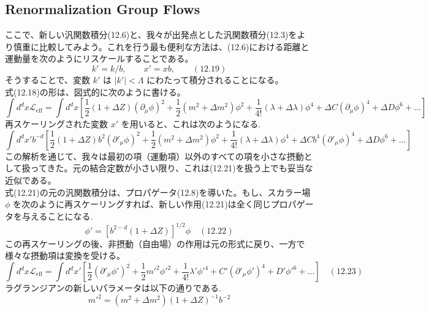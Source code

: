 \documentclass[uplatex,dvipdfmx]{jsarticle}
\begin{document}
\subsection{Renormalization Group Flows}
ここで、新しい汎関数積分(12.6)と、我々が出発点とした汎関数積分(12.3)をより慎重に比較してみよう。これを行う最も便利な方法は、(12.6)における距離と運動量を次のようにリスケールすることである。
\begin{equation}
    k' = k/b, \qquad x' = xb, \qquad (12.19)
\end{equation}
そうすることで、変数 $k'$ は $|k'| < \Lambda$ にわたって積分されることになる。\\
式(12.18)の形は、図式的に次のように書ける。
\begin{equation}
    \int d^d x \mathcal{L}_{\text{eff}} = \int d^d x \left[ \frac{1}{2}(1 + \Delta Z)(\partial_\mu \phi)^2 + \frac{1}{2}(m^2 + \Delta m^2)\phi^2 + \frac{1}{4!}(\lambda + \Delta \lambda)\phi^4 + \Delta C (\partial_\mu \phi)^4 + \Delta D \phi^6 + \dots \right] 
\end{equation}
再スケーリングされた変数 $x'$ を用いると、これは次のようになる.
\begin{equation*}
    \int d^d x' b^{-d} \left[ \frac{1}{2}(1 + \Delta Z)b^2 (\partial'_\mu \phi)^2 + \frac{1}{2}(m^2 + \Delta m^2)\phi^2 + \frac{1}{4!}(\lambda + \Delta \lambda)\phi^4 + \Delta C b^4 (\partial'_\mu \phi)^4 + \Delta D \phi^6 + \dots \right]
\end{equation*}
この解析を通じて、我々は最初の項（運動項）以外のすべての項を小さな摂動として扱ってきた。元の結合定数が小さい限り、これは(12.21)を扱う上でも妥当な近似である。\\
式(12.21)の元の汎関数積分は、プロパゲータ(12.8)を導いた。もし、スカラー場 $\phi$ を次のように再スケーリングすれば、新しい作用(12.21)は全く同じプロパゲータを与えることになる.
\begin{equation}
    \phi' = [b^{2-d}(1 + \Delta Z)]^{1/2} \phi \quad (12.22)
\end{equation}
この再スケーリングの後、非摂動（自由場）の作用は元の形式に戻り、一方で様々な摂動項は変換を受ける。
\begin{equation}
    \int d^d x \mathcal{L}_{\text{eff}} = \int d^d x' \left[ \frac{1}{2}(\partial'_\mu \phi')^2 + \frac{1}{2} m'^2 \phi'^2 + \frac{1}{4!} \lambda' \phi'^4 + C' (\partial'_\mu \phi')^4 + D' \phi'^6 + \dots \right] \quad (12.23)
\end{equation}
ラグランジアンの新しいパラメータは以下の通りである.
\begin{equation}
    m'^2  = (m^2 +\Delta m^2)(1+\Delta Z)^{-1} b^{-2}
\end{equation}
\end{document}
